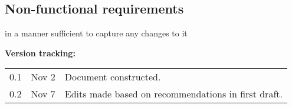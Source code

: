 \documentclass[12pt,a4paper]{article}
\begin{document}
\subsection{Non-functional requirements}
in a manner sufficient to capture any changes to it

\newpage
\textbf{Version tracking:}\\
\begin{tabular}{rrp{5.5in}}
0.1 & Nov 2 & Document constructed.\\
0.2 & Nov 7 & Edits made based on recommendations in first draft.\\

\end{tabular}
\end{document}
